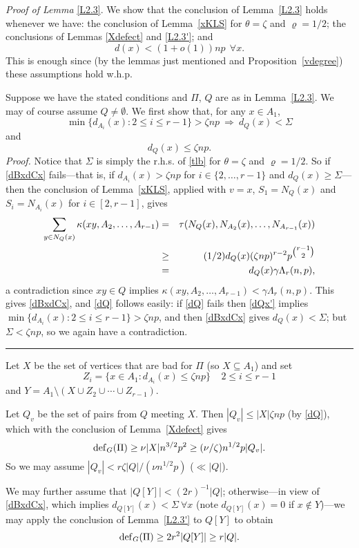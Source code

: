\documentclass[letterpaper,11pt]{article}
\newcommand{\beq}[1]{\begin{equation}\label{#1}}
\newcommand{\enq}[0]{\end{equation}}
\newcommand{\mn}[0]{\medskip\noindent}
\newcommand{\sub}[0]{\subseteq}
\newcommand{\sm}[0]{\setminus}
\renewcommand{\dots}[0]{,\ldots,}
\newcommand{\Ra}[0]{\Rightarrow}
\newcommand{\deff}[0]{{\rm def}}
\newcommand{\0}[0]{\emptyset}
\renewcommand{\qed}[0]{\begin{flushright} \rule{2mm}{3mm} \end{flushright}}
\newcommand{\Cc}[0]{\tbinom}
\newcommand{\gc}[0]{\gamma }
\newcommand{\gL}[0]{\Lambda}
\newcommand{\gS}[0]{\Sigma}
\newcommand{\gz}[0]{\zeta}
\newcommand{\vr}[0]{\varrho}
\newcommand{\glr}[0]{\gL_r(n,p)}
\begin{document}
\mn
{\em Proof of Lemma} \ref{L2.3}.
We show that the conclusion of Lemma~\ref{L2.3}
holds whenever we have:
the conclusion of Lemma~\ref{xKLS} for
$\theta =\gz$ and $\vr=1/2$;
the conclusions of Lemmas \ref{Xdefect} and \ref{L2.3'}; and
\beq{deg1}
d(x) < (1+o(1))np ~~\forall x.
\enq
%
This is enough since (by the lemmas just mentioned and
Proposition~\ref{vdegree}) these assumptions hold w.h.p.


Suppose we have the stated conditions and
$\Pi$, $Q$ are as in Lemma~\ref{L2.3}.
We may of course assume $Q\neq \0$.
We first show that,
for any $x\in A_1$,
\beq{dBxdCx}
\min\{d_{A_i}(x):2\leq i\leq r-1\}>\gz np
~\Ra~ d_Q(x)< \gS
\enq
and
\beq{dQ}
d_Q(x) \leq \gz np .
\enq
{\em Proof.}
Notice that $\gS$ is simply the r.h.s. of \eqref{tlb}
for $\theta =\gz$ and $\vr=1/2$.
So if \eqref{dBxdCx} fails---that is, if
$d_{A_i}(x)>\gz np$ for $i\in \{2\dots r-1\}$
and $d_Q(x)\geq \gS$---then
the conclusion of Lemma~\ref{xKLS}, applied
with $v=x$, $S_1 =N_Q(x)$ and $S_i =N_{A_i}(x)$ for $i\in [2,r-1]$,
gives
\begin{eqnarray*}
\sum_{y\in N_Q(x)}\kappa(xy,A_2\dots A_{r-1})&=&
\tau(N_Q(x),N_{A_2}(x)\dots N_{A_{r-1}}(x))\\
&\geq &(1/2)d_Q(x)(\gz np)^{r-2}p^{\Cc{r-1}{2}} \\
&=&d_Q(x)\gc \gL_r(n,p),
\end{eqnarray*}
a contradiction since
$xy\in Q$ implies $\kappa(xy,A_2\dots A_{r-1})< \gc \glr$.
This gives \eqref{dBxdCx}, and \eqref{dQ} follows easily:
if \eqref{dQ} fails then
\eqref{dQx'} implies
$\min\{d_{A_i}(x):2\leq i\leq r-1\}>\gz np$,
and then \eqref{dBxdCx} gives $d_Q(x)< \gS$;
but
$\gS <\gz np$,
so we again have a contradiction.\qed

\medskip
Let $X$ be the set of vertices that are bad for $\Pi$ (so $X\sub A_1$)
and set
\[
Z_i=\{x\in A_1:d_{A_i}(x)\leq \gz np\}  ~~~~~
2\leq i\leq r-1
\]
and $Y = A_1\sm (X\cup Z_2\cup\cdots \cup Z_{r-1})$.

Let $Q_v$ be the set of pairs from $Q$ meeting $X$.
Then $|Q_v|\leq |X|\gz np$ (by \eqref{dQ}),
which with the conclusion of
Lemma~\ref{Xdefect} gives
\[\deff_G(\Pi) \geq \nu |X|n^{3/2}p^2\geq (\nu/ \gz)n^{1/2}p|Q_v|.\]
So we may assume $|Q_v| < r\gz|Q|/(\nu n^{1/2}p)$ ($\ll |Q|$).


We may further assume that $|Q[Y]|< (2r)^{-1}|Q|$;
otherwise---in view of \eqref{dBxdCx}, which implies
$d_{Q[Y]}(x)<\gS ~\forall x$
(note $d_{Q[Y]}(x)=0$ if $x\not\in Y$)---we may apply
the conclusion of Lemma~\ref{L2.3'} to $Q[Y]$ to obtain
\[\deff_G(\Pi) \geq 2r^2|Q[Y]|\geq r |Q|.\]
\end{document}
